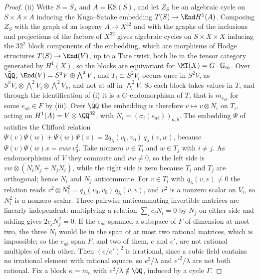 \begin{proof}
(ii) Write $S=S_{\lambda}$ and $A=\mathrm{KS}(S)$, and let $Z_{S}$ be an
algebraic cycle on $S\times A\times A$ inducing the Kuga--Satake embedding
$T(S)\to\End H^{1}(A)$. Composing $Z_{S}$ with the graph of an isogeny
$A\to X^{32}$ and with the graphs of the inclusions and projections of the
factors of $X^{32}$ gives algebraic cycles on $S\times X\times X$ inducing the
$32^{2}$ block components of the embedding, which are morphisms of Hodge
structures $T(S)\to\End(V)$, up to a Tate twist; both lie in the tensor
category generated by $H^{1}(X)$, so the blocks are equivariant for
$\MT(X)=G\cdot\mathbb{G}_{m}$. Over $\bar{\QQ}$,
$\End(V)=S^{2}V\oplus\bigwedge^{2}V$, and $T_{i}\cong S^{2}V_{i}$ occurs once
in $S^{2}V$, as $S^{2}V_{i}\otimes\bigwedge^{2}V_{j}\otimes\bigwedge^{2}V_{k}$,
and not at all in $\bigwedge^{2}V$. So each block takes values in $T$, and
through the identification of (i) it is a $G$-endomorphism of $T$, that is
$m_{e_{ab}}$ for some $e_{ab}\in F$ by (iii). Over
$\bar{\QQ}$ the embedding is therefore $v\mapsto v\otimes N_{i}$ on $T_{i}$,
acting on $H^{1}(A)=V\otimes\QQ^{32}$, with
$N_{i}=(\sigma_{i}(e_{ab}))_{a,b}$. The embedding $\Psi$ of
\cite[Proposition~11.7]{paperI} satisfies the Clifford relation
$\Psi(v)\Psi(w)+\Psi(w)\Psi(v)=2q_{\lambda}(v_{0},v_{0})\,q_{\lambda}(v,w)$,
because
$\Psi(v)\Psi(w)x=vwx\,v_{0}^{2}$. Take nonzero $v\in T_{i}$ and
$w\in T_{j}$ with $i\ne j$. As endomorphisms of $V$ they commute and $vw\ne0$,
so the left side is $vw\otimes(N_{i}N_{j}+N_{j}N_{i})$, while the right side
is zero because $T_{i}$ and $T_{j}$ are orthogonal; hence $N_{i}$ and $N_{j}$
anticommute. For $v\in T_{i}$ with $q_{\lambda}(v,v)\ne0$ the relation reads
$v^{2}\otimes N_{i}^{2}=q_{\lambda}(v_{0},v_{0})\,q_{\lambda}(v,v)$, and $v^{2}$
is a nonzero scalar on $V_{i}$, so $N_{i}^{2}$ is a nonzero scalar. Three pairwise
anticommuting invertible matrices are linearly independent: multiplying a
relation $\sum_{i}c_{i}N_{i}=0$ by $N_{j}$ on either side and adding gives
$2c_{j}N_{j}^{2}=0$. If the $e_{ab}$ spanned a subspace of $F$ of dimension at
most two, the three $N_{i}$ would lie in the span of at most two rational
matrices, which is impossible; so the $e_{ab}$ span $F$, and two of them, $e$
and $e'$, are not rational multiples of each other. Then $(e/e')^{2}$ is irrational, since a cubic field
contains no irrational element with rational square, so $e^{2}/\lambda$ and
$e'^{2}/\lambda$ are not both rational. Fix a block $\kappa=m_{e}$ with
$e^{2}/\lambda\notin\QQ$, induced by a cycle $\Gamma$.


\end{proof}
